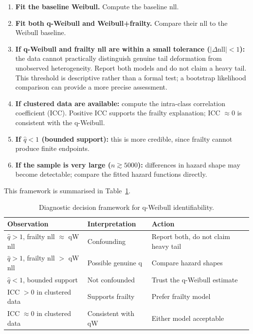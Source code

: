 \documentclass[12pt,a4paper]{article}
\begin{document}
\begin{enumerate}
\item \textbf{Fit the baseline Weibull.} Compute the baseline nll.
\item \textbf{Fit both q-Weibull and Weibull+frailty.} Compare their nll to the Weibull baseline.
\item \textbf{If q-Weibull and frailty nll are within a small tolerance ($|\Delta\mathrm{nll}|<1$):} the data cannot practically distinguish genuine tail deformation from unobserved heterogeneity. Report both models and do not claim a heavy tail. This threshold is descriptive rather than a formal test; a bootstrap likelihood comparison can provide a more precise assessment.
\item \textbf{If clustered data are available:} compute the intra-class correlation coefficient (ICC). Positive ICC supports the frailty explanation; ICC $\approx 0$ is consistent with the q-Weibull.
\item \textbf{If $\hat q<1$ (bounded support):} this is more credible, since frailty cannot produce finite endpoints.
\item \textbf{If the sample is very large ($n\gtrsim 5000$):} differences in hazard shape may become detectable; compare the fitted hazard functions directly.
\end{enumerate}

This framework is summarised in Table~\ref{tab:diagnostic}.

\begin{table}[ht]
\centering
\caption{Diagnostic decision framework for q-Weibull identifiability.}
\begin{tabular}{lll}
\toprule
Observation & Interpretation & Action \\
\midrule
$\hat q>1$, frailty nll $\approx$ qW nll & Confounding & Report both, do not claim heavy tail \\
$\hat q>1$, frailty nll $>$ qW nll & Possible genuine q & Compare hazard shapes \\
$\hat q<1$, bounded support & Not confounded & Trust the q-Weibull estimate \\
ICC $>0$ in clustered data & Supports frailty & Prefer frailty model \\
ICC $\approx 0$ in clustered data & Consistent with qW & Either model acceptable \\
\bottomrule
\end{tabular}
\label{tab:diagnostic}
\end{table}
\end{document}
